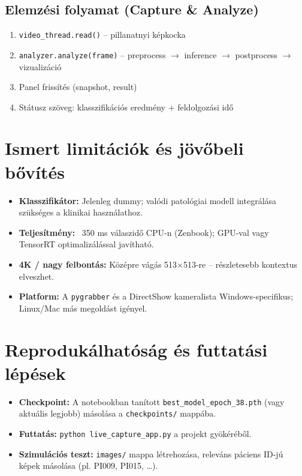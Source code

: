 \subsection{Elemzési folyamat (Capture \& Analyze)}
\begin{enumerate}
    \item \texttt{video\_thread.read()} – pillanatnyi képkocka
    \item \texttt{analyzer.analyze(frame)} – preprocess $\rightarrow$ inference $\rightarrow$ postprocess $\rightarrow$ vizualizáció
    \item Panel frissítés (snapshot, result)
    \item Státusz szöveg: klasszifikációs eredmény + feldolgozási idő
\end{enumerate}

\section{Ismert limitációk és jövőbeli bővítés}

\begin{itemize}
    \item \textbf{Klasszifikátor:} Jelenleg dummy; valódi patológiai modell integrálása szükséges a klinikai használathoz.
    \item \textbf{Teljesítmény:} ~350 ms válaszidő CPU-n (Zenbook); GPU-val vagy TensorRT optimalizálással javítható.
    \item \textbf{4K / nagy felbontás:} Középre vágás 513×513-re – részletesebb kontextus elveszhet.
    \item \textbf{Platform:} A \texttt{pygrabber} és a DirectShow kameralista Windows-specifikus; Linux/Mac más megoldást igényel.
\end{itemize}

\section{Reprodukálhatóság és futtatási lépések}

\begin{itemize}
    \item \textbf{Checkpoint:} A notebookban tanított \texttt{best\_model\_epoch\_38.pth} (vagy aktuális legjobb) másolása a \texttt{checkpoints/} mappába.
    \item \textbf{Futtatás:} \texttt{python live\_capture\_app.py} a projekt gyökéréből.
    \item \textbf{Szimulációs teszt:} \texttt{images/} mappa létrehozása, releváns páciens ID-jú képek másolása (pl. PI009, PI015, …).
\end{itemize}
